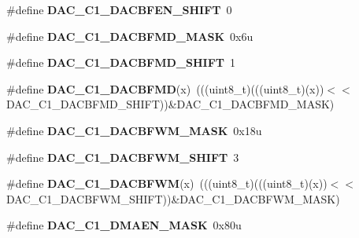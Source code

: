 \begin{DoxyCompactItemize}
\item 
\#define {\bfseries D\+A\+C\+\_\+\+C1\+\_\+\+D\+A\+C\+B\+F\+E\+N\+\_\+\+S\+H\+I\+FT}~0\hypertarget{group__DAC__Register__Masks_ga2062351429a9e737c0ac434488b59fe4}{}\label{group__DAC__Register__Masks_ga2062351429a9e737c0ac434488b59fe4}

\item 
\#define {\bfseries D\+A\+C\+\_\+\+C1\+\_\+\+D\+A\+C\+B\+F\+M\+D\+\_\+\+M\+A\+SK}~0x6u\hypertarget{group__DAC__Register__Masks_ga28373e4d9ae322da4f6a37933a340b78}{}\label{group__DAC__Register__Masks_ga28373e4d9ae322da4f6a37933a340b78}

\item 
\#define {\bfseries D\+A\+C\+\_\+\+C1\+\_\+\+D\+A\+C\+B\+F\+M\+D\+\_\+\+S\+H\+I\+FT}~1\hypertarget{group__DAC__Register__Masks_ga779629844ed0967b310e7f2721c54624}{}\label{group__DAC__Register__Masks_ga779629844ed0967b310e7f2721c54624}

\item 
\#define {\bfseries D\+A\+C\+\_\+\+C1\+\_\+\+D\+A\+C\+B\+F\+MD}(x)~(((uint8\+\_\+t)(((uint8\+\_\+t)(x))$<$$<$D\+A\+C\+\_\+\+C1\+\_\+\+D\+A\+C\+B\+F\+M\+D\+\_\+\+S\+H\+I\+FT))\&D\+A\+C\+\_\+\+C1\+\_\+\+D\+A\+C\+B\+F\+M\+D\+\_\+\+M\+A\+SK)\hypertarget{group__DAC__Register__Masks_gabfcb0420c4e52f927d23e6c28554d648}{}\label{group__DAC__Register__Masks_gabfcb0420c4e52f927d23e6c28554d648}

\item 
\#define {\bfseries D\+A\+C\+\_\+\+C1\+\_\+\+D\+A\+C\+B\+F\+W\+M\+\_\+\+M\+A\+SK}~0x18u\hypertarget{group__DAC__Register__Masks_gaad89dbfc60735cf12eb6cfff9157fffa}{}\label{group__DAC__Register__Masks_gaad89dbfc60735cf12eb6cfff9157fffa}

\item 
\#define {\bfseries D\+A\+C\+\_\+\+C1\+\_\+\+D\+A\+C\+B\+F\+W\+M\+\_\+\+S\+H\+I\+FT}~3\hypertarget{group__DAC__Register__Masks_gacc4542331c55b93fe589d439a69122f7}{}\label{group__DAC__Register__Masks_gacc4542331c55b93fe589d439a69122f7}

\item 
\#define {\bfseries D\+A\+C\+\_\+\+C1\+\_\+\+D\+A\+C\+B\+F\+WM}(x)~(((uint8\+\_\+t)(((uint8\+\_\+t)(x))$<$$<$D\+A\+C\+\_\+\+C1\+\_\+\+D\+A\+C\+B\+F\+W\+M\+\_\+\+S\+H\+I\+FT))\&D\+A\+C\+\_\+\+C1\+\_\+\+D\+A\+C\+B\+F\+W\+M\+\_\+\+M\+A\+SK)\hypertarget{group__DAC__Register__Masks_ga2084f4d4d9fd92156a8011e26ffb55a8}{}\label{group__DAC__Register__Masks_ga2084f4d4d9fd92156a8011e26ffb55a8}

\item 
\#define {\bfseries D\+A\+C\+\_\+\+C1\+\_\+\+D\+M\+A\+E\+N\+\_\+\+M\+A\+SK}~0x80u\hypertarget{group__DAC__Register__Masks_ga091be41dfd851b71978ab7298c372292}{}\label{group__DAC__Register__Masks_ga091be41dfd851b71978ab7298c372292}


\end{DoxyCompactItemize}
